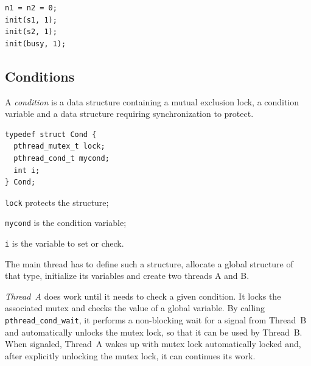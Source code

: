 \begin{verbatim}
n1 = n2 = 0;
init(s1, 1);
init(s2, 1);
init(busy, 1);
\end{verbatim}

\begin{Parallel}{}{}
\end{Parallel}

\subsection{Conditions}
A \emph{condition} is a data structure containing a mutual exclusion lock, a condition variable and a data structure requiring synchronization to protect.

\begin{verbatim}
typedef struct Cond {
  pthread_mutex_t lock;
  pthread_cond_t mycond;
  int i;
} Cond;
\end{verbatim}

\begin{description}
\item \texttt{lock} protects the structure;
\item \texttt{mycond} is the condition variable;
\item \texttt{i} is the variable to set or check.
\end{description}

The main thread has to define such a structure, allocate a global structure of that type, initialize its variables and create two threads A and B.

\textit{Thread~A} does work until it needs to check a given condition. It locks the associated mutex and checks the value of a global variable. By calling \texttt{pthread\_cond\_wait}, it performs a non-blocking wait for a signal from Thread~B and automatically unlocks the mutex lock, so that it can be used by Thread~B. When signaled, Thread~A wakes up with mutex lock automatically locked and, after explicitly unlocking the mutex lock, it can continues its work.

